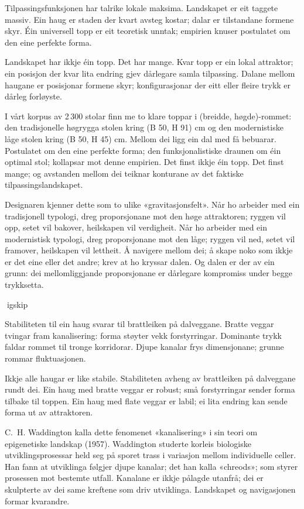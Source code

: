 Tilpassingsfunksjonen har talrike lokale maksima. Landskapet er eit taggete massiv. Ein haug er staden der kvart avsteg kostar; dalar er tilstandane formene skyr. Éin universell topp er eit teoretisk unntak; empirien knuser postulatet om den eine perfekte forma.

Landskapet har ikkje éin topp. Det har mange. Kvar topp er ein lokal attraktor; ein posisjon der kvar lita endring gjev dårlegare samla tilpassing. Dalane mellom haugane er posisjonar formene skyr; konfigurasjonar der eitt eller fleire trykk er dårleg forløyste.

I vårt korpus av 2\,300 stolar finn me to klare toppar i (breidde, høgde)-rommet: den tradisjonelle høgrygga stolen kring (B  50, H  91) cm og den modernistiske låge stolen kring (B  50, H  45) cm. Mellom dei ligg ein dal med få bebuarar. Postulatet om den eine perfekte forma; den funksjonalistiske draunen om éin optimal stol; kollapsar mot denne empirien. Det finst ikkje éin topp. Det finst mange; og avstanden mellom dei teiknar konturane av det faktiske tilpassingslandskapet.

Designaren kjenner dette som to ulike «gravitasjonsfelt». Når ho arbeider med ein tradisjonell typologi, dreg proporsjonane mot den høge attraktoren; ryggen vil opp, setet vil bakover, heilskapen vil verdigheit. Når ho arbeider med ein modernistisk typologi, dreg proporsjonane mot den låge; ryggen vil ned, setet vil framover, heilskapen vil lettheit. Å navigere mellom dei; å skape noko som ikkje er det eine eller det andre; krev at ho kryssar dalen. Og dalen er der av ein grunn: dei mellomliggjande proporsjonane er dårlegare kompromiss under begge trykksetta.

igskip

Stabiliteten til ein haug svarar til brattleiken på dalveggane. Bratte veggar tvingar fram kanalisering: forma støyter vekk forstyrringar. Dominante trykk faldar rommet til tronge korridorar. Djupe kanalar frys dimensjonane; grunne rommar fluktuasjonen.

Ikkje alle haugar er like stabile. Stabiliteten avheng av brattleiken på dalveggane rundt dei. Ein haug med bratte veggar er robust; små forstyrringar sender forma tilbake til toppen. Ein haug med flate veggar er labil; ei lita endring kan sende forma ut av attraktoren.

C.~H. Waddington kalla dette fenomenet «kanalisering» i sin teori om epigenetiske landskap (1957). Waddington studerte korleis biologiske utviklingsprosessar held seg på sporet trass i variasjon mellom individuelle celler. Han fann at utviklinga følgjer djupe kanalar; det han kalla «chreods»; som styrer prosessen mot bestemte utfall. Kanalane er ikkje pålagde utanfrå; dei er skulpterte av dei same kreftene som driv utviklinga. Landskapet og navigasjonen formar kvarandre.

